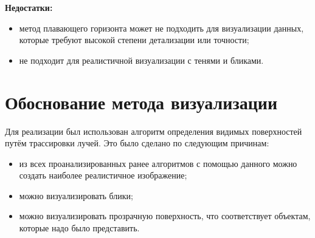 \textbf{Недостатки:}
\begin{itemize}
	\item метод плавающего горизонта может не подходить для визуализации данных, которые требуют высокой степени детализации или точности;
	\item не подходит для реалистичной визуализации с тенями и бликами.
\end{itemize}

\section{Обоснование метода визуализации}
Для реализации был использован алгоритм определения видимых поверхностей путём трассировки лучей. Это было сделано по следующим причинам:
\begin{itemize}
	\item из всех проанализированных ранее алгоритмов с помощью данного можно создать наиболее реалистичное изображение;
	\item можно визуализировать блики;
	\item можно визуализировать прозрачную поверхность, что соответствует объектам, которые надо было представить.
\end{itemize}
\clearpage
